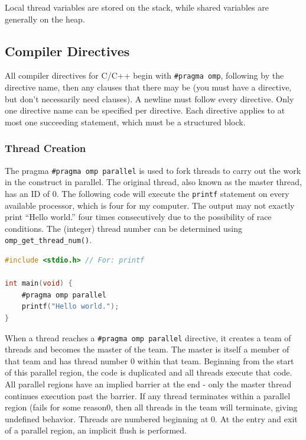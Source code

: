 \documentclass[10pt]{article}
\begin{document}
\begin{flushleft}
Local thread variables are stored on the stack, while shared variables are generally on the heap.

\subsection{Compiler Directives}

All compiler directives for C/C++ begin with {\tt \#pragma omp}, following by the directive name, then any clauses that there may be (you must have a directive, but don't necessarily need clauses). A newline must follow every directive. Only one directive name can be specified per directive. Each directive applies to at most one succeeding statement, which must be a structured block. 

\subsubsection{Thread Creation}

The pragma {\tt \#pragma omp parallel} is used to fork threads to carry out the work in the construct in parallel. The original thread, also known as the master thread, has an ID of 0. The following code will execute the {\tt printf} statement on every available processor, which is four for my computer. The output may not exactly print ``Hello world.'' four times consecutively due to the possibility of race conditions. The (integer) thread number can be determined using {\tt omp\_get\_thread\_num()}.

\begin{lstlisting}[language=C, basicstyle=\ttfamily\small]
#include <stdio.h> // For: printf

int main(void) {
	#pragma omp parallel
	printf("Hello world.");
}
\end{lstlisting}

When a thread reaches a {\tt \#pragma omp parallel} directive, it creates a team of threads and becomes the master of the team. The master is itself a member of that team and has thread number 0 within that team. Beginning from the start of this parallel region, the code is duplicated and all threads execute that code. All parallel regions have an implied barrier at the end - only the master thread continues execution past the barrier. If any thread terminates within a parallel region (fails for some reason0, then all threads in the team will terminate, giving undefined behavior. Threads are numbered beginning at 0. At the entry and exit of a parallel region, an implicit flush is performed.


\end{flushleft}
\end{document}
